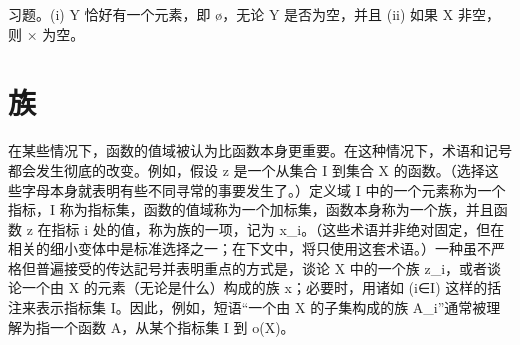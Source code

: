 \documentclass[12pt,a4paper]{ctexbook}
\theoremstyle{definition}
\theoremstyle{remark}
\begin{document}
习题。(i) Y 恰好有一个元素，即 ø，无论 Y 是否为空，并且 (ii) 如果 X 非空，则 × 为空。


\chapter{族}

在某些情况下，函数的值域被认为比函数本身更重要。在这种情况下，术语和记号都会发生彻底的改变。例如，假设 z 是一个从集合 I 到集合 X 的函数。（选择这些字母本身就表明有些不同寻常的事要发生了。）定义域 I 中的一个元素称为一个指标，I 称为指标集，函数的值域称为一个加标集，函数本身称为一个族，并且函数 z 在指标 i 处的值，称为族的一项，记为 x\_i。（这些术语并非绝对固定，但在相关的细小变体中是标准选择之一；在下文中，将只使用这套术语。）一种虽不严格但普遍接受的传达記号并表明重点的方式是，谈论 X 中的一个族 {z\_i}，或者谈论一个由 X 的元素（无论是什么）构成的族 {x}；必要时，用诸如 (i∈I) 这样的括注来表示指标集 I。因此，例如，短语“一个由 X 的子集构成的族 {A\_i}”通常被理解为指一个函数 A，从某个指标集 I 到 o(X)。
\end{document}
